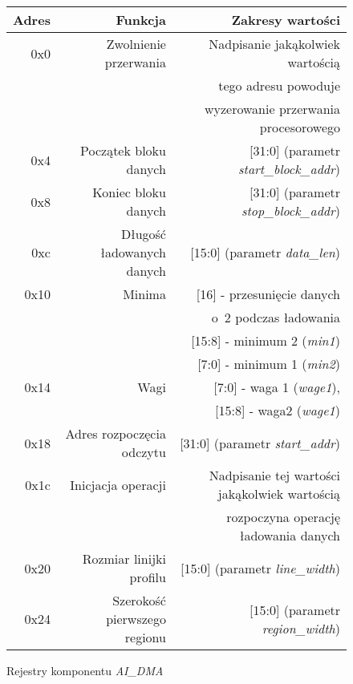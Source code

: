 \begin{figure}[h]
	\centering
	\begin{tabular}{|r|r|r|}
		\hline
		Adres & Funkcja & Zakresy wartości\\
		\hline
		0x0 & Zwolnienie przerwania & Nadpisanie jakąkolwiek wartością \\
		& & tego adresu powoduje \\
		& & wyzerowanie przerwania procesorowego\\
		
		\hline 
		0x4 & Początek bloku danych & [31:0] (parametr \textit{start\_block\_addr})\\
		
		\hline 
		0x8 & Koniec bloku danych & [31:0] (parametr \textit{stop\_block\_addr})\\
		
		\hline 
		0xc & Długość ładowanych danych  & [15:0] (parametr \textit{data\_len})\\
		
		\hline 
		0x10 & Minima & [16] - przesunięcie danych \\
			 &		  & o~2 podczas ładowania  \\
			 &        & [15:8] - minimum 2 (\textit{min1}) \\
			 &		  & [7:0] - minimum 1 (\textit{min2})\\
		
		\hline 
		0x14 & Wagi & [7:0] - waga 1 (\textit{wage1}), \\
			 &      & [15:8] - waga2 (\textit{wage1})\\
			 
		\hline 
		0x18 & Adres rozpoczęcia odczytu & [31:0] (parametr \textit{start\_addr})\\
		
		\hline 
		0x1c & Inicjacja operacji & Nadpisanie tej wartości jakąkolwiek wartością\\
			 & 					  & rozpoczyna operację ładowania danych\\
			 
			 
			 \hline 
		0x20 & Rozmiar linijki profilu & [15:0] (parametr \textit{line\_width})\\
		
		\hline 
		0x24 & Szerokość pierwszego regionu & [15:0] (parametr \textit{region\_width})\\
		\hline
	\end{tabular}
	
	\caption{Rejestry komponentu \textit{AI\_DMA}}
\end{figure}
\FloatBarrier %

